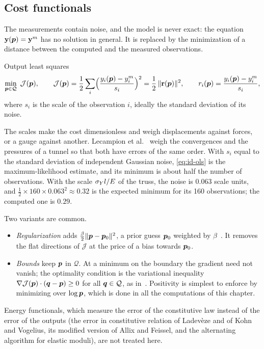 \subsection{Cost functionals}
The measurements contain noise, and the model is never exact: the equation
$\mathbf{y}(\bm{p})=\mathbf{y}^m$ has no solution in general. It is replaced by the
minimization of a distance between the computed and the measured observations.
\begin{gbox}{Output least squares}\label{def:id-ols}
\begin{equation}\label{eq:id-ols}
  \min_{\bm{p}\in\mathcal Q}\ \mathcal J(\bm{p}),\qquad
  \mathcal J(\bm{p})=\frac12\sum_{i}\Bigl(\frac{y_i(\bm{p})-y^m_i}{s_i}\Bigr)^2
  =\frac12\,\lVert \mathbf{r}(\bm{p})\rVert^2 ,\qquad
  r_i(\bm{p})=\frac{y_i(\bm{p})-y^m_i}{s_i},
\end{equation}
where $s_i$ is the scale of the observation $i$, ideally the standard deviation
of its noise.
\end{gbox}
\noindent The scales make the cost dimensionless and weigh displacements
against forces, or a gauge against another. Lecampion et
al.~\cite{LecampionConstantinescuNguyen2002} weigh the convergences and the
pressures of a tunnel so that both have errors of the same order. With
$s_i$ equal to the standard deviation of independent Gaussian noise,
\eqref{eq:id-ols} is the maximum-likelihood estimate, and its minimum is about
half the number of observations. With the scale $\sigma_{Y} l/E$ of the truss, the noise
is $0.063$ scale units, and $\tfrac12\times160\times0.063^2\approx0.32$ is the
expected minimum for its 160 observations; the computed one is $0.29$.

Two variants are common.
\begin{itemize}
  \item \emph{Regularization} adds $\tfrac\beta2\lVert \bm{p}-\bm{p}_0\rVert^2$, a prior
  guess $\bm{p}_0$ weighted by $\beta$~\cite{Tarantola2005}. It removes the flat
  directions of $\mathcal J$ at the price of a bias towards $\bm{p}_0$.
  \item \emph{Bounds} keep $\bm{p}$ in $\mathcal Q$. At a minimum on the boundary
  the gradient need not vanish; the optimality condition is the variational
  inequality $\nabla\mathcal J(\bm{p})\cdot(\bm{q}-\bm{p})\ge0$ for all $\bm{q}\in\mathcal Q$,
  as in~\cite{ConstantinescuTardieu2001b}. Positivity is simplest to enforce by
  minimizing over $\log\bm{p}$, which is done in all the computations of this
  chapter.
\end{itemize}
Energy functionals, which measure the error of the constitutive law instead of
the error of the outputs (the error in constitutive relation of Ladev\`eze and
of Kohn and Vogelius, its modified version of Allix and Feissel, and the
alternating algorithm for elastic moduli), are not treated here.


